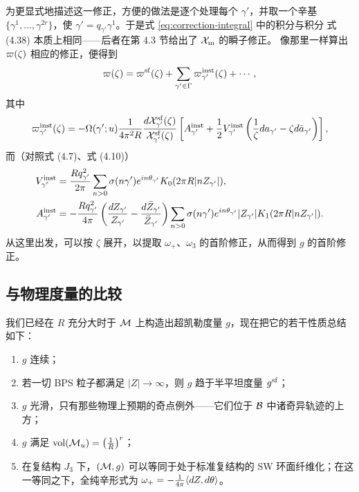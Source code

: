 为更显式地描述这一修正，方便的做法是逐个处理每个 $\gamma'$，并取一个辛基 $\{\gamma^1, \dots, \gamma^{2r}\}$，使 $\gamma' = q_{\gamma'} \gamma^1$。于是式 \eqref{eq:correction-integral} 中的积分与积分 式 (4.38) 本质上相同——后者在第 4.3 节给出了 $\CX_\magn$ 的瞬子修正。%
像那里一样算出 $\hsymp(\zeta)$ 相应的修正，便得到
\begin{equation}
\hsymp(\zeta) = \hsymp^\sf(\zeta) + \sum_{\gamma' \in \clat} \hsymp^\inst_{\gamma'}(\zeta) + \cdots,
\end{equation}
其中
\begin{equation} \label{eq:Omega-inst-general}
\hsymp^\inst_{\gamma'}(\zeta) = - \degen(\gamma';u) \frac{1}{4 \pi^2 R}\frac{d \CX^\sf_{\gamma'}(\zeta)}{\CX^\sf_{\gamma'}(\zeta)} \left[ A^\inst_{\gamma'} +
\frac{1}{2} V^\inst_{\gamma'} \left(\frac{1}{\zeta} da_{\gamma'} - \zeta d\bar{a}_{\gamma'}\right)\right],
\end{equation}
而（对照式 (4.7)、式 (4.10)）%
\begin{align} \label{eq:A-inst-general}
V^\inst_{\gamma'} &= \frac{R q_{\gamma'}^2}{2\pi} \sum_{n>0}
\sigma(n \gamma') e^{i n \theta_{\gamma'}} K_0(2 \pi R \abs{n
Z_{\gamma'}}), \\
A^\inst_{\gamma'} &= - \frac{R q_{\gamma'}^2}{4 \pi} \left( \frac{dZ_{\gamma'}}{Z_{\gamma'}} - \frac{d \bar Z_{\gamma'}}{\bar Z_{\gamma'}} \right) \sum_{n>0} \sigma(n \gamma') e^{i n \theta_{\gamma'}} \abs{Z_{\gamma'}} K_1(2 \pi R \abs{n Z_{\gamma'}}).
\end{align}
从这里出发，可以按 $\zeta$ 展开，以提取 $\omega_+$、$\omega_3$ 的首阶修正，从而得到 $g$ 的首阶修正。

\subsection{与物理度量的比较}
\label{sec:comparison}

我们已经在 $R$ 充分大时于 $\CM$ 上构造出超凯勒度量 $g$，现在把它的若干性质总结如下：

\begin{enumerate}
\item $g$ 连续；
\item 若一切 BPS 粒子都满足 $|Z| \to \infty$，则 $g$ 趋于半平坦度量 $g^\sf$；
\item $g$ 光滑，只有那些物理上预期的奇点例外——它们位于 $\vm$ 中诸奇异轨迹的上方；
\item $g$ 满足 $\vol(\CM_u) = \left(\frac{1}{R}\right)^{r}$；
\item 在复结构 $J_3$ 下，$(\CM, g)$ 可以等同于处于标准复结构的 SW 环面纤维化；在这一等同之下，全纯辛形式为 $\omega_+ = - \frac{1}{4 \pi} \inprod{dZ, d\theta}$。
\end{enumerate}

